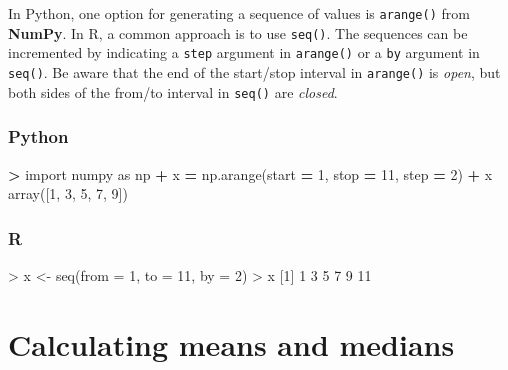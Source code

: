 \documentclass[
]{book}
\newenvironment{Shaded}{\begin{snugshade}}{\end{snugshade}}
\newcommand{\AttributeTok}[1]{\textcolor[rgb]{0.77,0.63,0.00}{#1}}
\newcommand{\DecValTok}[1]{\textcolor[rgb]{0.00,0.00,0.81}{#1}}
\newcommand{\FunctionTok}[1]{\textcolor[rgb]{0.00,0.00,0.00}{#1}}
\newcommand{\ImportTok}[1]{#1}
\newcommand{\NormalTok}[1]{#1}
\newcommand{\OperatorTok}[1]{\textcolor[rgb]{0.81,0.36,0.00}{\textbf{#1}}}
\newcommand{\OtherTok}[1]{\textcolor[rgb]{0.56,0.35,0.01}{#1}}
\newcommand{\SpecialCharTok}[1]{\textcolor[rgb]{0.00,0.00,0.00}{#1}}
\begin{document}
In Python, one option for generating a sequence of values is \texttt{arange()} from \textbf{NumPy}. In R, a common approach is to use \texttt{seq()}. The sequences can be incremented by indicating a \texttt{step} argument in \texttt{arange()} or a \texttt{by} argument in \texttt{seq()}. Be aware that the end of the start/stop interval in \texttt{arange()} is \emph{open}, but both sides of the from/to interval in \texttt{seq()} are \emph{closed}.

\hypertarget{python-5}{%
\subsubsection*{Python}\label{python-5}}

\begin{Shaded}
\begin{Highlighting}[]
\OperatorTok{\textgreater{}} \ImportTok{import}\NormalTok{ numpy }\ImportTok{as}\NormalTok{ np}
\OperatorTok{+}\NormalTok{ x }\OperatorTok{=}\NormalTok{ np.arange(start }\OperatorTok{=} \DecValTok{1}\NormalTok{, stop }\OperatorTok{=} \DecValTok{11}\NormalTok{, step }\OperatorTok{=} \DecValTok{2}\NormalTok{)}
\OperatorTok{+}\NormalTok{ x}
\NormalTok{array([}\DecValTok{1}\NormalTok{, }\DecValTok{3}\NormalTok{, }\DecValTok{5}\NormalTok{, }\DecValTok{7}\NormalTok{, }\DecValTok{9}\NormalTok{])}
\end{Highlighting}
\end{Shaded}

\hypertarget{r-5}{%
\subsubsection*{R}\label{r-5}}

\begin{Shaded}
\begin{Highlighting}[]
\SpecialCharTok{\textgreater{}}\NormalTok{ x }\OtherTok{\textless{}{-}} \FunctionTok{seq}\NormalTok{(}\AttributeTok{from =} \DecValTok{1}\NormalTok{, }\AttributeTok{to =} \DecValTok{11}\NormalTok{, }\AttributeTok{by =} \DecValTok{2}\NormalTok{)}
\SpecialCharTok{\textgreater{}}\NormalTok{ x}
\NormalTok{[}\DecValTok{1}\NormalTok{]  }\DecValTok{1}  \DecValTok{3}  \DecValTok{5}  \DecValTok{7}  \DecValTok{9} \DecValTok{11}
\end{Highlighting}
\end{Shaded}

\hypertarget{calculating-means-and-medians}{%
\section{Calculating means and medians}\label{calculating-means-and-medians}}
\end{document}

